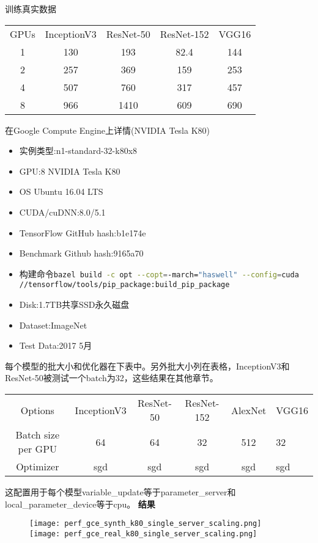 训练真实数据
\begin{table}
	\begin{tabular}{|c|c|c|c|c|}
		GPUs	&InceptionV3	&ResNet-50	&ResNet-152	&VGG16\\
		1	&130	&193	&82.4	&144\\
		2	&257	&369	&159	&253\\
		4	&507	&760	&317	&457\\
		8	&966	&1410	&609	&690\\
	\end{tabular}
\end{table}
在Google Compute Engine上详情(NVIDIA Tesla K80)
\begin{itemize}
	\item  实例类型:n1-standard-32-k80x8
	\item  GPU:8 NVIDIA Tesla K80
	\item OS Ubuntu 16.04 LTS 
	\item CUDA/cuDNN:8.0/5.1
	\item TensorFlow GitHub hash:b1e174e
	\item Benchmark Github hash:9165a70
	\item 构建命令\lstinline[language=Bash]{bazel build -c opt --copt=-march="haswell" --config=cuda //tensorflow/tools/pip_package:build_pip_package}
	\item Disk:1.7TB共享SSD永久磁盘
	\item Dataset:ImageNet 
	\item Test Data:2017 5月
\end{itemize}
每个模型的批大小和优化器在下表中。另外批大小列在表格，InceptionV3和ResNet-50被测试一个batch为32，这些结果在其他章节。
\begin{table}[H]
	\begin{tabular}{|c|c|c|c|c|}
		Options	&InceptionV3	&ResNet-50	&ResNet-152	&AlexNet	&VGG16\\
		Batch size per GPU	&64	&64	&32	&512	&32\\
		Optimizer	&sgd	&sgd	&sgd	&sgd	&sgd\\
	\end{tabular}
\end{table}
这配置用于每个模型variable\_update等于parameter\_server和local\_parameter\_device等于cpu。
\textbf{结果}\\
\begin{figure}[H]
	\centering
	\texttt{[image: perf\_gce\_synth\_k80\_single\_server\_scaling.png]}
	\texttt{[image: perf\_gce\_real\_k80\_single\_server\_scaling.png]}
\end{figure}
